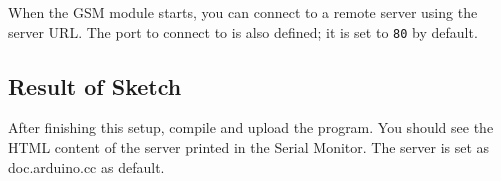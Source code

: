 

When the GSM module starts, you can connect to a remote server using the server URL. The port to connect to is also defined; it is set to \texttt{80} by default.



\subsection{Result of Sketch}
After finishing this setup, compile and upload the program. You should see the HTML content of the server printed in the Serial Monitor. The server is set as doc.arduino.cc as default. \cite{ArduinoPortentaSketch:2024}


	

